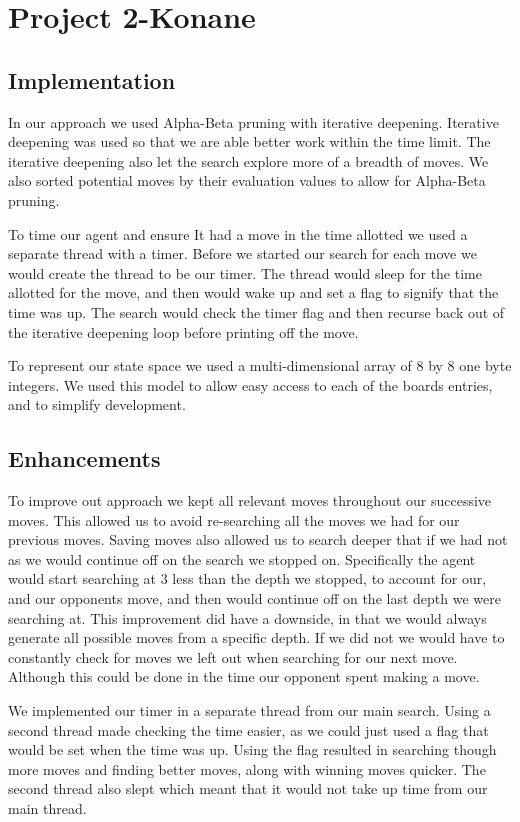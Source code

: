 \documentclass[12pt]{article}
\begin{document}
\section*{Project 2-Konane}

\subsection*{Implementation}
In our approach we used Alpha-Beta pruning with iterative deepening.
Iterative deepening was used so that we are able better work within the time limit.
The iterative deepening also let the search explore more of a breadth of moves.
We also sorted potential moves by their evaluation values to allow for Alpha-Beta pruning.

To time our agent and ensure It had a move in the time allotted we used a separate thread with a timer.
Before we started our search for each move we would create the thread to be our timer.
The thread would sleep for the time allotted for the move, and then would wake up and set a flag to signify that the time was up.
The search would check the timer flag and then recurse back out of the iterative deepening loop before printing off the move.

To represent our state space we used a multi-dimensional array of 8 by 8 one byte integers.
We used this model to allow easy access to each of the boards entries, and to simplify development.

\subsection*{Enhancements}
To improve out approach we kept all relevant moves throughout our successive moves.
This allowed us to avoid re-searching all the moves we had for our previous moves.
Saving moves also allowed us to search deeper that if we had not as we would continue off on the search we stopped on.
Specifically the agent would start searching at 3 less than the depth we stopped, to account for our, and our opponents move, and then would continue off on the last depth we were searching at.
This improvement did have a downside, in that we would always generate all possible moves from a specific depth.
If we did not we would have to constantly check for moves we left out when searching for our next move.
Although this could be done in the time our opponent spent making a move.

We implemented our timer in a separate thread from our main search.
Using a second thread made checking the time easier, as we could just used a flag that would be set when the time was up.
Using the flag resulted in searching though more moves and finding better moves, along with winning moves quicker.
The second thread also slept which meant that it would not take up time from our main thread.
\end{document}
